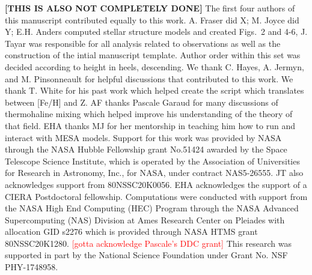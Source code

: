 \documentclass[linenumbers,twocolumn]{aastex62}
\begin{document}
\begin{comment}
\begin{figure}[!htb]
\begin{center}
\texttt{[image: ./Figs/protversusloggmodelpmmPYboth.eps]}%
\caption{The measured core rotation rates for the stars in our sample as a function of gravity compared to the predictions of our solid body model (blue) and our model with a moderately differentially convection zone (pink), showing that these models provide limits on the allowable amount of radial differential rotation in the surface convection zone.}
\label{Fig:bothmodels}
\end{center}
\end{figure}
\end{comment}

\begin{acknowledgements}
\textbf{[THIS IS ALSO NOT COMPLETELY DONE]}
The first four authors of this manuscript contributed equally to this work. A. Fraser did X; M. Joyce did Y; E.H. Anders computed stellar structure models and created Figs.~2 and 4-6, J. Tayar was responsible for all analysis related to observations as well as the construction of the intial manuscript template. Author order within this set was decided according to height in heels, descending.   
We thank C. Hayes, A. Jermyn, and M. Pinsonneault for helpful discussions that contributed to this work.  
We thank T. White for his past work which helped create the script which translates between [Fe/H] and Z.
AF thanks Pascale Garaud for many discussions of thermohaline mixing which helped improve his understanding of the theory of that field.
EHA thanks MJ for her mentorship in teaching him how to run and interact with MESA models.
%
Support for this work was provided by NASA through the NASA Hubble Fellowship grant No.51424 awarded by the Space Telescope Science Institute, which is operated by the Association of Universities for Research in Astronomy, Inc., for NASA, under contract NAS5-26555. JT also acknowledges support from 80NSSC20K0056. 
 EHA acknowledges the support of a CIERA Postdoctoral fellowship.
 Computations were conducted with support from the NASA High End Computing (HEC) Program through the NASA Advanced Supercomputing (NAS) Division at Ames Research Center on Pleiades with allocation GID s2276 which is provided through NASA HTMS grant 80NSSC20K1280. \textcolor{red}{[gotta acknowledge Pascale's DDC grant]}
This research was supported in part by the National Science Foundation under Grant No. NSF PHY-1748958.


\end{acknowledgements}
\end{document}
